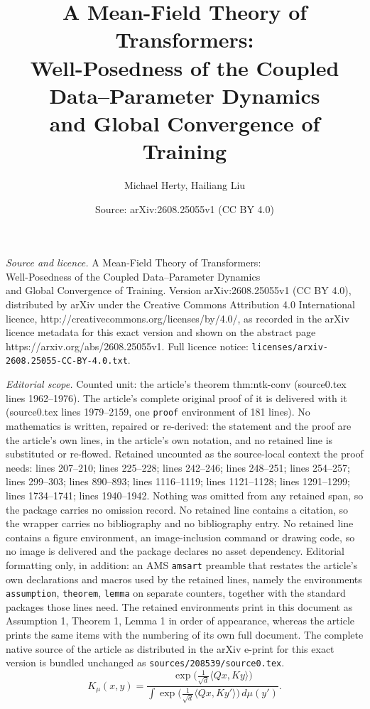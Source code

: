 \documentclass[10pt,a4paper]{amsart}
\title{A Mean-Field Theory of Transformers:\\ Well-Posedness of the Coupled Data--Parameter Dynamics\\ and Global Convergence of Training}
\author{Michael Herty, Hailiang Liu}
\date{Source: arXiv:2608.25055v1 (CC BY 4.0)}
\begin{document}
\maketitle

\noindent\emph{Source and licence.} A Mean-Field Theory of Transformers:\\ Well-Posedness of the Coupled Data--Parameter Dynamics\\ and Global Convergence of Training. Version arXiv:2608.25055v1 (CC BY 4.0), distributed by arXiv under the Creative Commons Attribution 4.0 International licence, http://creativecommons.org/licenses/by/4.0/, as recorded in the arXiv licence metadata for this exact version and shown on the abstract page https://arxiv.org/abs/2608.25055v1. Full licence notice: \texttt{licenses/arxiv-2608.25055-CC-BY-4.0.txt}.\par\smallskip

\noindent\textit{Editorial scope.} Counted unit: the article's theorem thm:ntk-conv (source0.tex lines 1962--1976). The article's complete original proof of it is delivered with it (source0.tex lines 1979--2159, one \texttt{proof} environment of 181 lines). No mathematics is written, repaired or re-derived: the statement and the proof are the article's own lines, in the article's own notation, and no retained line is substituted or re-flowed.  Retained uncounted as the source-local context the proof needs: lines 207--210; lines 225--228; lines 242--246; lines 248--251; lines 254--257; lines 299--303; lines 890--893; lines 1116--1119; lines 1121--1128; lines 1291--1299; lines 1734--1741; lines 1940--1942.  Nothing was omitted from any retained span, so the package carries no omission record.  No retained line contains a citation, so the wrapper carries no bibliography and no bibliography entry.  No retained line contains a figure environment, an image-inclusion command or drawing code, so no image is delivered and the package declares no asset dependency.  Editorial formatting only, in addition: an AMS \texttt{amsart} preamble that restates the article's own declarations and macros used by the retained lines, namely the environments \texttt{assumption}, \texttt{theorem}, \texttt{lemma} on separate counters, together with the standard packages those lines need.  The retained environments print in this document as Assumption 1, Theorem 1, Lemma 1 in order of appearance, whereas the article prints the same items with the numbering of its own full document.  The complete native source of the article as distributed in the arXiv e-print for this exact version is bundled unchanged as \texttt{sources/208539/source0.tex}.
\begin{equation}
K_\mu(x,y) = \frac{\exp\big(\tfrac1{\sqrt d}\langle Qx,Ky\rangle\big)}{\int \exp\big(\tfrac1{\sqrt d}\langle Qx,Ky'\rangle\big)\,d\mu(y')}.
\label{eq:kernel}
\end{equation}
\end{document}
